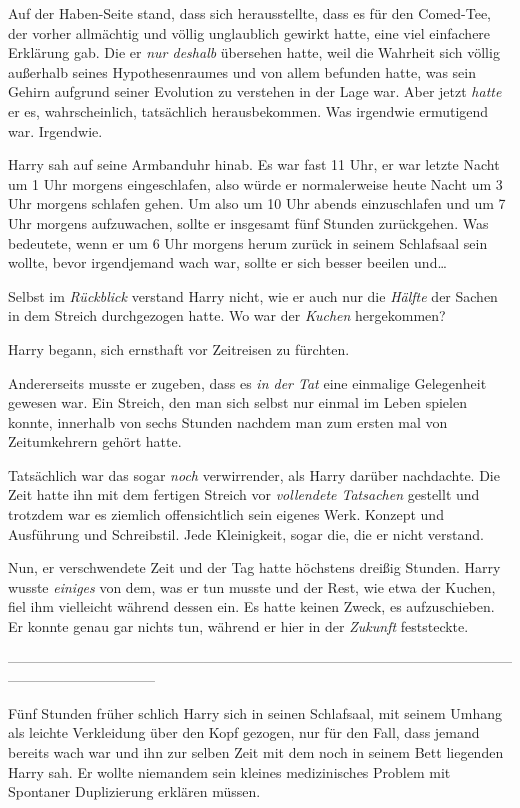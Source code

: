 {Auf der Haben-Seite stand, dass sich herausstellte, dass es für den Comed-Tee, der vorher allmächtig und völlig unglaublich gewirkt hatte, eine viel einfachere Erklärung gab. Die er \emph{nur deshalb} übersehen hatte, weil die Wahrheit sich völlig außerhalb seines Hypothesenraumes und von allem befunden hatte, was sein Gehirn aufgrund seiner Evolution zu verstehen in der Lage war. Aber jetzt \emph{hatte} er es, wahrscheinlich, tatsächlich herausbekommen. Was irgendwie ermutigend war. Irgendwie.

Harry sah auf seine Armbanduhr hinab. Es war fast 11 Uhr, er war letzte Nacht um 1 Uhr morgens eingeschlafen, also würde er normalerweise heute Nacht um 3 Uhr morgens schlafen gehen. Um also um 10 Uhr abends einzuschlafen und um 7 Uhr morgens aufzuwachen, sollte er insgesamt fünf Stunden zurückgehen. Was bedeutete, wenn er um 6 Uhr morgens herum zurück in seinem Schlafsaal sein wollte, bevor irgendjemand wach war, sollte er sich besser beeilen und…

Selbst im \emph{Rückblick} verstand Harry nicht, wie er auch nur die \emph{Hälfte} der Sachen in dem Streich durchgezogen hatte. Wo war der \emph{Kuchen} hergekommen?

Harry begann, sich ernsthaft vor Zeitreisen zu fürchten.

Andererseits musste er zugeben, dass es \emph{in der Tat} eine einmalige Gelegenheit gewesen war. Ein Streich, den man sich selbst nur einmal im Leben spielen konnte, innerhalb von sechs Stunden nachdem man zum ersten mal von Zeitumkehrern gehört hatte.

Tatsächlich war das sogar \emph{noch} verwirrender, als Harry darüber nachdachte. Die Zeit hatte ihn mit dem fertigen Streich vor \emph{vollendete Tatsachen} gestellt und trotzdem war es ziemlich offensichtlich sein eigenes Werk. Konzept und Ausführung und Schreibstil. Jede Kleinigkeit, sogar die, die er nicht verstand.

Nun, er verschwendete Zeit und der Tag hatte höchstens dreißig Stunden. Harry wusste \emph{einiges} von dem, was er tun musste und der Rest, wie etwa der Kuchen, fiel ihm vielleicht während dessen ein. Es hatte keinen Zweck, es aufzuschieben. Er konnte genau gar nichts tun, während er hier in der \emph{Zukunft} feststeckte.

--------------------------------------------------------------------------------------------------------------------------------------------

Fünf Stunden früher schlich Harry sich in seinen Schlafsaal, mit seinem Umhang als leichte Verkleidung über den Kopf gezogen, nur für den Fall, dass jemand bereits wach war und ihn zur selben Zeit mit dem noch in seinem Bett liegenden Harry sah. Er wollte niemandem sein kleines medizinisches Problem mit Spontaner Duplizierung erklären müssen.

}
